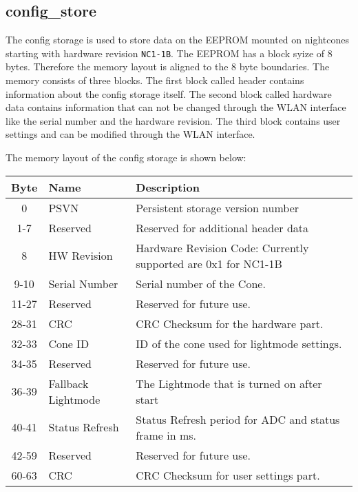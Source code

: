 \subsection{config\_store}
The config storage is used to store data on the EEPROM mounted on nightcones starting with hardware revision \texttt{NC1-1B}. The EEPROM has a block syize of 8 bytes. Therefore the memory layout is aligned to the 8 byte boundaries. The memory consists of three blocks. The first block called header contains information about the config storage itself. The second block called hardware data contains information that can not be changed through the WLAN interface like the serial number and the hardware revision. The third block contains user settings and can be modified through the WLAN interface.  

The memory layout of the config storage is shown below: 
\begin{table}[ht!]
\begin{tabular}{|c|l|l|}
	\textbf{Byte} & \textbf{Name} & \textbf{Description}\\\hline
	0 & PSVN & Persistent storage version number\\\hline
	1-7 & Reserved & Reserved for additional header data\\\hline\hline
	
	8 & HW Revision & Hardware Revision Code: Currently supported are 0x1 for NC1-1B\\\hline
	9-10 & Serial Number & Serial number of the Cone. \\\hline
	11-27 & Reserved & Reserved for future use. \\\hline
	28-31 & CRC & CRC Checksum for the hardware part.\\\hline\hline
	
	32-33 & Cone ID & ID of the cone used for lightmode settings.\\\hline
	34-35 & Reserved & Reserved for future use. \\\hline
	36-39 & Fallback Lightmode & The Lightmode that is turned on after start\\\hline
	40-41 & Status Refresh & Status Refresh period for ADC and status frame in ms. \\\hline
	42-59 & Reserved & Reserved for future use. \\\hline
	60-63 & CRC & CRC Checksum for user settings part. \\\hline
\end{tabular}
\end{table}

